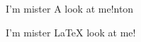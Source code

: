 \documentclass{article}
\newcommand{\lookAtMe}[1]{\vbox{I'm mister #1 look at me!}}
\begin{document}
\vspace*{\fill}\vspace{-5ex}

\lookAtMe Anton

\lookAtMe\LaTeX

\vspace*{\fill}
\end{document}
